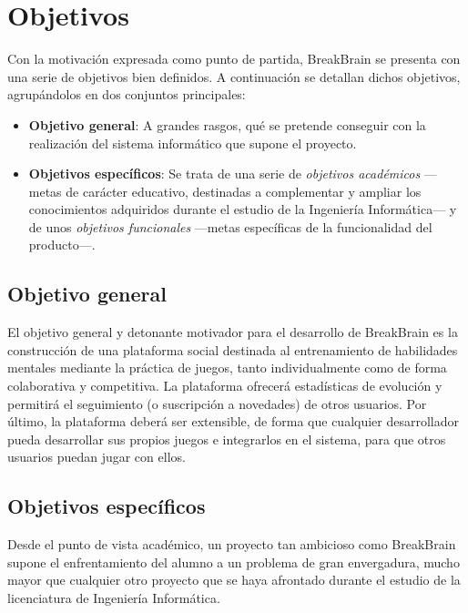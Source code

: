 \section{Objetivos}
\label{sec::objetivos}

Con la motivación expresada como punto de partida, BreakBrain se presenta con una serie de objetivos bien definidos. A continuación se detallan dichos objetivos, agrupándolos en dos conjuntos principales:

\begin{itemize}
\item {\bf Objetivo general}: A grandes rasgos, qué se pretende conseguir con la realización del sistema informático que supone el proyecto.
\item {\bf Objetivos específicos}: Se trata de una serie de {\it objetivos académicos} ---metas de carácter educativo, destinadas a complementar y ampliar los conocimientos adquiridos durante el estudio de la Ingeniería Informática--- y de unos {\it objetivos funcionales} ---metas específicas de la funcionalidad del producto---.
\end{itemize}

\subsection{Objetivo general}

El objetivo general y detonante motivador para el desarrollo de BreakBrain es la construcción de una plataforma social destinada al entrenamiento de habilidades mentales mediante la práctica de juegos, tanto individualmente como de forma colaborativa y competitiva. La plataforma ofrecerá estadísticas de evolución y permitirá el seguimiento (o suscripción a novedades) de otros usuarios. Por último, la plataforma deberá ser extensible, de forma que cualquier desarrollador pueda desarrollar sus propios juegos e integrarlos en el sistema, para que otros usuarios puedan jugar con ellos.

\subsection{Objetivos específicos}

Desde el punto de vista académico, un proyecto tan ambicioso como BreakBrain supone el enfrentamiento del alumno a un problema de gran envergadura, mucho mayor que cualquier otro proyecto que se haya afrontado durante el estudio de la licenciatura de Ingeniería Informática.

